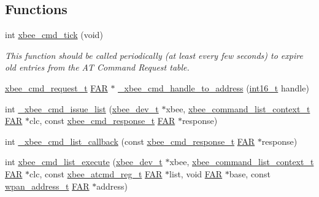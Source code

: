 \subsection*{Functions}
\begin{DoxyCompactItemize}
\item 
int \hyperlink{group__xbee__atcmd_ga7ef08f6771da8c18234bbffca2be4ff3}{xbee\+\_\+cmd\+\_\+tick} (void)
\begin{DoxyCompactList}\small\item\em This function should be called periodically (at least every few seconds) to expire old entries from the AT Command Request table. \end{DoxyCompactList}\item 
\hyperlink{structxbee__cmd__request__t}{xbee\+\_\+cmd\+\_\+request\+\_\+t} \hyperlink{group__hal_gaef060b3456fdcc093a7210a762d5f2ed}{F\+AR} $\ast$ \hyperlink{group__xbee__atcmd_ga710b2223cda09c52a8518c964da88347}{\+\_\+xbee\+\_\+cmd\+\_\+handle\+\_\+to\+\_\+address} (\hyperlink{group__hal__dos_ga2140805d08462d474b82ddc8d1c2f3e6}{int16\+\_\+t} handle)
\item 
int \hyperlink{group__xbee__atcmd_ga4931ffe3ba31eaf16eee72ac0a95015b}{\+\_\+xbee\+\_\+cmd\+\_\+issue\+\_\+list} (\hyperlink{structxbee__dev__t}{xbee\+\_\+dev\+\_\+t} $\ast$xbee, \hyperlink{structxbee__command__list__context__t}{xbee\+\_\+command\+\_\+list\+\_\+context\+\_\+t} \hyperlink{group__hal_gaef060b3456fdcc093a7210a762d5f2ed}{F\+AR} $\ast$clc, const \hyperlink{structxbee__cmd__response__t}{xbee\+\_\+cmd\+\_\+response\+\_\+t} \hyperlink{group__hal_gaef060b3456fdcc093a7210a762d5f2ed}{F\+AR} $\ast$response)
\item 
int \hyperlink{group__xbee__atcmd_ga9f1bad1621dfd1d13b6f1102fc592d13}{\+\_\+xbee\+\_\+cmd\+\_\+list\+\_\+callback} (const \hyperlink{structxbee__cmd__response__t}{xbee\+\_\+cmd\+\_\+response\+\_\+t} \hyperlink{group__hal_gaef060b3456fdcc093a7210a762d5f2ed}{F\+AR} $\ast$response)
\item 
int \hyperlink{group__xbee__atcmd_gab9fb2f15b9134bd32d937a51e4c68014}{xbee\+\_\+cmd\+\_\+list\+\_\+execute} (\hyperlink{structxbee__dev__t}{xbee\+\_\+dev\+\_\+t} $\ast$xbee, \hyperlink{structxbee__command__list__context__t}{xbee\+\_\+command\+\_\+list\+\_\+context\+\_\+t} \hyperlink{group__hal_gaef060b3456fdcc093a7210a762d5f2ed}{F\+AR} $\ast$clc, const \hyperlink{structxbee__atcmd__reg__t}{xbee\+\_\+atcmd\+\_\+reg\+\_\+t} \hyperlink{group__hal_gaef060b3456fdcc093a7210a762d5f2ed}{F\+AR} $\ast$list, void \hyperlink{group__hal_gaef060b3456fdcc093a7210a762d5f2ed}{F\+AR} $\ast$base, const \hyperlink{structwpan__address__t}{wpan\+\_\+address\+\_\+t} \hyperlink{group__hal_gaef060b3456fdcc093a7210a762d5f2ed}{F\+AR} $\ast$address)

\end{DoxyCompactItemize}
